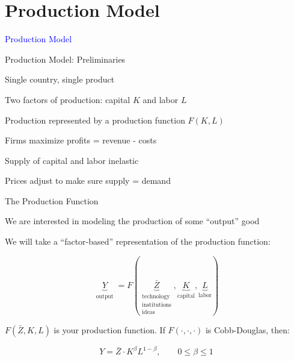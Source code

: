 \documentclass[notes,11pt, aspectratio=169, xcolor=table]{beamer}
\newcommand{\blue}[1]{\textcolor{blue}{#1}}
\newenvironment{wideitemize}{\itemize\addtolength{\itemsep}{10pt}}{\enditemize}
\begin{document}
\section{Production Model}

\begin{frame}
\addtocounter{framenumber}{-1}

\centering

\Huge{\blue{Production Model}}
    
\end{frame}

\begin{frame}{Production Model: Preliminaries}
\begin{wideitemize}
        \item Single country, single product
        \item Two factors of production: capital $K$ and labor $L$ 
        \item Production represented by a production function $F(K,L)$
        \item Firms maximize profits = revenue - costs
        \item Supply of capital and labor inelastic  
        \item Prices adjust to make sure supply = demand
    \end{wideitemize}
\end{frame}



\begin{frame}{The Production Function}

\begin{wideitemize}
\item We are interested in modeling the production of some ``output'' good
\item We will take a “factor‐based” representation of the production function:

\begin{equation*}
\underbrace{Y}_{\substack{\text{output}}} = F(\underbrace{\bar{Z}}_{\substack{\text{technology}\\\text{institutions}\\\text{ideas}}}, \underbrace{K}_{\text{capital}} , \underbrace{L}_{\text{labor}})
\end{equation*}

\item $F(\bar{Z}, K, L)$ is your production function. If $F(\cdot, \cdot, \cdot)$ is Cobb-Douglas, then:

\begin{equation*}
    Y = \bar{Z} \cdot K^{\beta} L^{1-\beta}, \qquad 0 \le \beta \le 1  
\end{equation*}

\end{wideitemize}

\end{frame}
\end{document}
